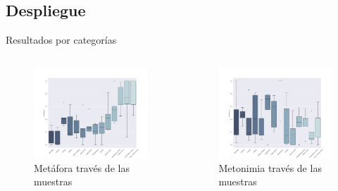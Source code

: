 \documentclass[presentation]{beamer}
\begin{document}
\subsection{Despliegue}
\label{sec:org444e20f}
\begin{frame}[label={sec:org0e93e78}]{Resultados por categorías}
\begin{columns}
\begin{column}{0.48\columnwidth}
\begin{figure}[H]
\centering
\includegraphics[width=\linewidth]{./resultados/graphs/total/accum_cat_metafora.png}

\caption{Metáfora través de las muestras }
\end{figure}
\end{column}

\begin{column}{0.48\columnwidth}
\begin{figure}[H]
\includegraphics[width=\linewidth]{./resultados/graphs/total/accum_cat_metonimia.png}
\caption{Metonimia través de las muestras }
\centering

\end{figure}
\end{column}
\end{columns}
\end{frame}
\end{document}
